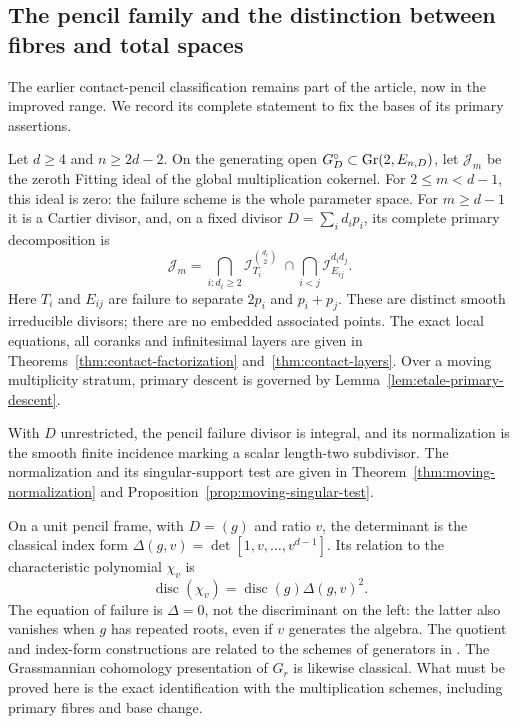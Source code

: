 \subsection*{The pencil family and the distinction between fibres and total spaces}
The earlier contact-pencil classification remains part of the article,
now in the improved range. We record its complete statement to fix
the bases of its primary assertions.

\begin{theorem}\label{thm:contact-main}
Let $d\ge4$ and $n\ge2d-2$. On the generating open
$G_D^\circ\subset\operatorname{Gr}(2,E_{n,D})$, let $\mathcal J_m$ be the
zeroth Fitting ideal of the global multiplication cokernel.
For $2\le m<d-1$, this ideal is zero: the failure scheme is the
whole parameter space. For $m\ge d-1$ it is a Cartier divisor,
and, on a fixed divisor $D=\sum_i d_i p_i$, its complete primary
decomposition is
\begin{equation}\label{eq:intro-contact-primary}
 \mathcal J_m=
 \bigcap_{i:d_i\ge2}\mathcal I_{T_i}^{\binom{d_i}{2}}
 \ \cap\!\bigcap_{i<j}\mathcal I_{E_{ij}}^{d_i d_j}.
\end{equation}
Here $T_i$ and $E_{ij}$ are failure to separate $2p_i$ and
$p_i+p_j$. These are distinct smooth irreducible divisors; there
are no embedded associated points. The exact local equations,
all coranks and infinitesimal layers are given in
Theorems~\ref{thm:contact-factorization} and~\ref{thm:contact-layers}.
Over a moving multiplicity stratum, primary descent is governed by
Lemma~\ref{lem:etale-primary-descent}.

With $D$ unrestricted, the pencil failure divisor is integral, and
its normalization is the smooth finite incidence marking a scalar
length-two subdivisor. The normalization and its singular-support
test are given in Theorem~\ref{thm:moving-normalization} and
Proposition~\ref{prop:moving-singular-test}.
\end{theorem}

On a unit pencil frame, with $D=(g)$ and ratio $v$, the determinant
is the classical index form
$\Delta(g,v)=\det[1,v,\ldots,v^{d-1}]$. Its relation to the
characteristic polynomial $\chi_v$ is
\[
 \operatorname{disc}(\chi_v)=\operatorname{disc}(g)\Delta(g,v)^2.
\]
The equation of failure is $\Delta=0$, not the discriminant on the
left: the latter also vanishes when $g$ has repeated roots, even if
$v$ generates the algebra. The quotient and index-form constructions
are related to the schemes of generators in \cite{ABHS}. The
Grassmannian cohomology presentation of $G_r$ is likewise classical.
What must be proved here is the exact identification with the
multiplication schemes, including primary fibres and base change.

